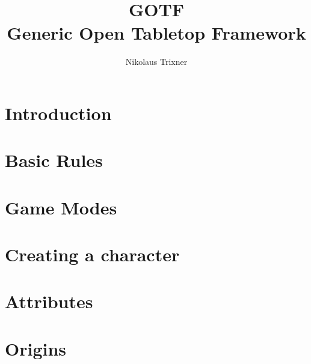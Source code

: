 \documentclass[a4paper]{book}
\begin{document}
    \title{GOTF \\ Generic Open Tabletop Framework}
    \author{Nikolaus Trixner}

    \maketitle

    \tableofcontents

    

    \part{Introduction}\label{part:intrudction}
    


    \part{Basic Rules}\label{part:basicRules}
    


    \part{Game Modes}\label{part:gameModes}
    
    
    
    
    

    \part{Creating a character}\label{part:characterCreation}
    

    \part{Attributes}\label{part:attributes}
    
    
    

    \part{Origins}\label{part:origins}
    
    
    
\end{document}
